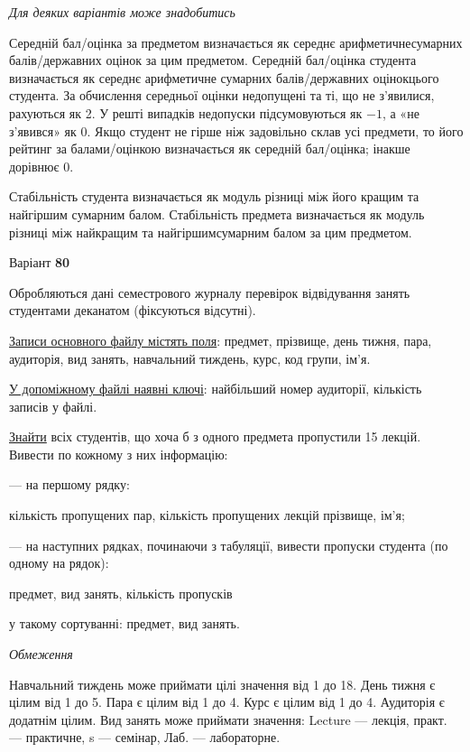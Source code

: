 \documentclass[11pt, ukrainian]{article}
\begin{document}
\bigskip\textit{Для деяких варіантів може знадобитись}

Середній бал/оцінка за предметом визначається як середнє арифметичнесумарних балів/державних оцінок за цим предметом. 
Середній бал/оцінка студента визначається як середнє арифметичне сумарних балів/державних оцінокцього студента. 
За обчислення середньої оцінки недопущені та ті, що не з’явилися, рахуються як 2.
У решті випадків недопуски підсумовуються як $-1$, а «не з’явився» як 0.
Якщо студент не гірше ніж задовільно склав усі предмети, 
то його рейтинг за балами/оцінкою визначається як середній бал/оцінка; інакше дорівнює 0.

Стабільність студента визначається як модуль різниці між його кращим та найгіршим сумарним балом.
Стабільність предмета визначається як модуль різниці між найкращим та найгіршимсумарним балом за цим предметом.






\par
\newpage
{\center Варіант  \No \textbf { 80 }\par}
\bigskip
Обробляються дані семестрового журналу перевірок відвідування занять студентами деканатом (фіксуються відсутні). 

\underline{Записи основного файлу містять поля}: предмет, прізвище, день тижня, пара, аудиторія, вид занять, навчальний тиждень, курс, код групи, ім’я.

\underline{У допоміжному файлі наявні ключі}: найбільший номер аудиторії, кількість записів у файлі.

\underline{Знайти} всіх студентів, що хоча б з одного предмета пропустили 15 лекцій. Вивести по кожному з них інформацію:\par
{\noindent}--- на першому рядку:\par
кількість пропущених пар, кількість пропущених лекцій прізвище, ім’я;

{\noindent}--- на наступних рядках, починаючи з табуляції, вивести пропуски студента (по одному на рядок):\par
предмет, вид занять, кількість пропусків

{\noindent}у такому сортуванні: предмет, вид занять.


\bigskip\textit{Обмеження}

Навчальний тиждень може приймати цілі значення від 1 до 18.
День тижня є цілим від 1 до 5. Пара є цілим від 1 до 4.
Курс є цілим від 1 до 4. Аудиторія є додатнім цілим.
Вид занять може приймати значення:
Lecture --- лекція, практ. --- практичне, s --- семінар, Лаб. --- лабораторне.
\end{document}

